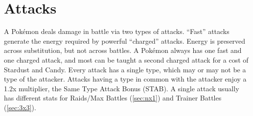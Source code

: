 \chapter{Attacks}
\label{chap:attacks}
A Pokémon deals damage in battle via two types of attacks.
``Fast'' attacks generate the energy required by powerful ``charged'' attacks.
Energy is preserved across substitution, but not across battles.
A Pokémon always has one fast and one charged attack, and most can be taught a second
  charged attack for a cost of Stardust and Candy.
Every attack has a single type, which may or may not be a type of the attacker.
Attacks having a type in common with the attacker enjoy a 1.2x multiplier, the Same Type Attack Bonus (STAB).
A single attack usually has different stats for Raids/Max Battles (\autoref{sec:nx1})
  and Trainer Battles (\autoref{sec:3x3}).

